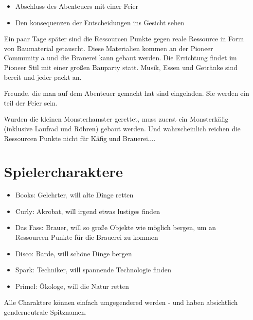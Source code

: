 \begin{itemize}
\item Abschluss des Abenteuers mit einer Feier
\item Den konsequenzen der Entscheidungen ins Gesicht sehen
\end{itemize}

Ein paar Tage später sind die Ressourcen Punkte gegen reale Ressource in Form von Baumaterial getauscht. Diese Materialien kommen an der Pioneer Community a und die Brauerei kann gebaut werden. Die Errichtung findet im Pioneer Stil mit einer großen Bauparty statt. Musik, Essen und Getränke sind bereit und jeder packt an.

Freunde, die man auf dem Abenteuer gemacht hat sind eingeladen. Sie werden ein teil der Feier sein.

Wurden die kleinen Monsterhamster gerettet, muss zuerst ein Monsterkäfig (inklusive Laufrad und Röhren) gebaut werden. Und wahrscheinlich reichen die Ressourcen Punkte nicht für Käfig und Brauerei....

\section{Spielercharaktere}

\begin{itemize}
\item Books: Gelehrter, will alte Dinge retten
\item Curly: Akrobat, will irgend etwas lustiges finden
\item Das Fass: Brauer, will so große Objekte wie möglich bergen, um an Ressourcen Punkte für die Brauerei zu kommen
\item Disco: Barde, will schöne Dinge bergen
\item Spark: Techniker, will spannende Technologie finden
\item Primel: Ökologe, will die Natur retten
\end{itemize}

Alle Charaktere können einfach umgegendered werden - und haben absichtlich genderneutrale Spitznamen.

